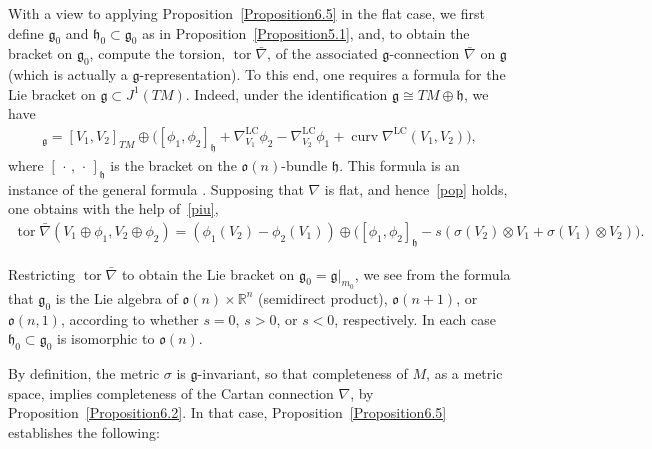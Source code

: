 \documentclass[pdftex]{sigma}
\newcommand{\levi}{\nabla^{\mathrm{LC}}}
\DeclareMathOperator{\curvature}{curv}
\DeclareMathOperator{\torsion}{tor}
\numberwithin{equation}{section}
\begin{document}
With a view to applying Proposition~\ref{Proposition6.5} %
in the f\/lat
case, we f\/irst def\/ine ${\mathfrak g}_0$ and ${\mathfrak h}_0 \subset
{\mathfrak g}_0 $ as in Proposition~\ref{Proposition5.1}, and, to obtain
the bracket on ${\mathfrak g}_0$, compute the torsion, $\torsion
\bar\nabla $, of the associated ${\mathfrak g}$-connection
$\bar\nabla$ on ${\mathfrak g} $ (which is actually a ${\mathfrak
  g}$-representation). To this end, one requires a formula for the Lie
bracket on ${\mathfrak g} \subset J^1(TM)$. Indeed, under the identif\/ication
${\mathfrak g} \cong {TM} \oplus {\mathfrak h} $, we have
\begin{gather}
  [V_1\oplus\phi_1,V_2\oplus\phi_2]_{\mathfrak g}=
  [V_1, V_2]_{{TM}}\oplus \big( [\phi_1,\phi_2]_{\mathfrak
    h}+\levi_{V_1}\phi_2-\levi_{V_2}\phi_1 +
  \curvature\levi(V_1,V_2) \big)\label{piu},
\end{gather} where
$[\,\cdot\,,\,\cdot \,]_{\mathfrak h}$ is the bracket on the
$\mathfrak{o}(n)$-bundle ${\mathfrak h} $. This formula is an instance
of the general formula \cite[Proposition~6.2(4)]{Blaom_12}. Supposing
that $\nabla $ is f\/lat, and hence~\eqref{pop} holds, one obtains with
the help of~\eqref{piu},
\begin{gather*}
  \torsion\bar{\nabla} (V_1\oplus\phi_1,
  V_2\oplus\phi_2)=
  ( \phi_1(V_2)-\phi_2(V_1) ) \oplus
  \big( [\phi_1,\phi_2]_{\mathfrak h}-s(\sigma (V_2)\otimes
  V_1+\sigma (V_1)\otimes V_2) \big).
\end{gather*}

Restricting $\torsion \bar\nabla $ to obtain the Lie bracket on
${\mathfrak g}_0={\mathfrak g}|_{m_0}$, we see from the formula that
${\mathfrak g}_0$ is the Lie algebra of $\mathfrak{o}(n)\times
{\mathbb R}^n $ (semidirect product), $\mathfrak{o}(n+1)$, or
$\mathfrak{o}(n,1)$, according to whether $s=0$, $s>0$, or $s<0$,
respectively. In each case ${\mathfrak h}_0 \subset {\mathfrak g}_0$
is isomorphic to $\mathfrak{o}(n)$.

By def\/inition, the metric $\sigma $ is ${\mathfrak g}$-invariant, so
that completeness of $M$, as a metric space, implies completeness of
the Cartan connection $\nabla $, by Proposition~\ref{Proposition6.2}. In that
case, Proposition~\ref{Proposition6.5} %
establishes the following:
\end{document}
